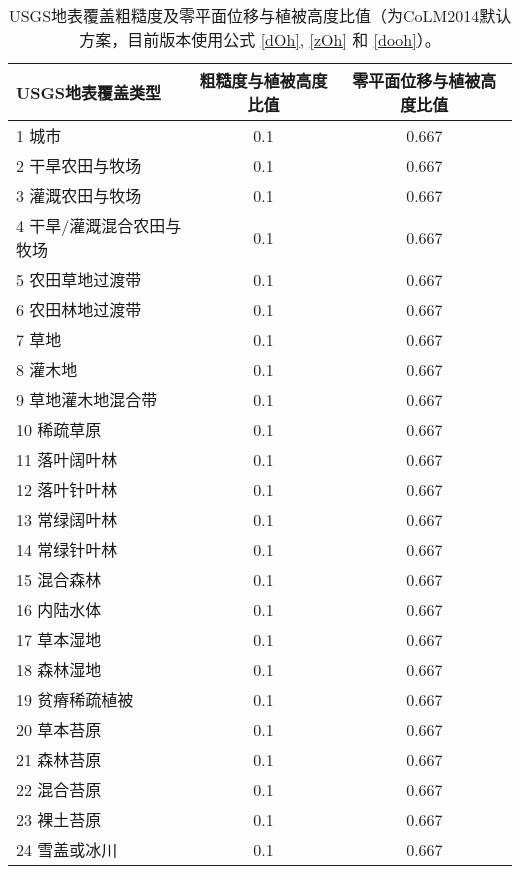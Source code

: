 \begin{table}[]
\centering
\caption{USGS地表覆盖粗糙度及零平面位移与植被高度比值（为CoLM2014默认方案，目前版本使用公式 \eqref{dOh}, \eqref{zOh} 和 \eqref{dooh}）。}
\label{tab:USGS地表覆盖粗糙度及零平面位移与植被高度比值}
\begin{tabular}{@{}lcc@{}}
\toprule
USGS地表覆盖类型     & 粗糙度与植被高度比值 & 零平面位移与植被高度比值 \\ \midrule
1 城市           & 0.1        & 0.667        \\
2 干旱农田与牧场      & 0.1        & 0.667        \\
3 灌溉农田与牧场      & 0.1        & 0.667        \\
4 干旱/灌溉混合农田与牧场 & 0.1        & 0.667        \\
5 农田草地过渡带      & 0.1        & 0.667        \\
6 农田林地过渡带      & 0.1        & 0.667        \\
7 草地           & 0.1        & 0.667        \\
8 灌木地          & 0.1        & 0.667        \\
9 草地灌木地混合带     & 0.1        & 0.667        \\
10 稀疏草原        & 0.1        & 0.667        \\
11 落叶阔叶林       & 0.1        & 0.667        \\
12 落叶针叶林       & 0.1        & 0.667        \\
13 常绿阔叶林       & 0.1        & 0.667        \\
14 常绿针叶林       & 0.1        & 0.667        \\
15 混合森林        & 0.1        & 0.667        \\
16 内陆水体        & 0.1        & 0.667        \\
17 草本湿地        & 0.1        & 0.667        \\
18 森林湿地        & 0.1        & 0.667        \\
19 贫瘠稀疏植被      & 0.1        & 0.667        \\
20 草本苔原        & 0.1        & 0.667        \\
21 森林苔原        & 0.1        & 0.667        \\
22 混合苔原        & 0.1        & 0.667        \\
23 裸土苔原        & 0.1        & 0.667        \\
24 雪盖或冰川       & 0.1        & 0.667        \\ \bottomrule
\end{tabular}
\end{table}


